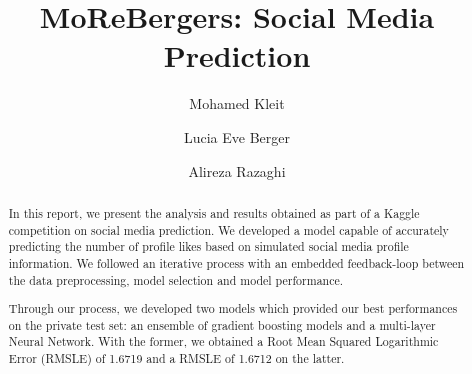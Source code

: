\documentclass[sigplan,screen]{acmart}
\begin{document}
\title{MoReBergers: Social Media Prediction}

\author{Mohamed Kleit}

\author{Lucia Eve Berger}

\author{Alireza  Razaghi}

\begin{abstract}
In this report, we present the analysis and results obtained as part of a Kaggle competition on social media prediction. We developed a model capable of accurately predicting the number of profile likes based on simulated social media profile information. We followed an iterative process with an embedded feedback-loop between the data preprocessing, model selection and model performance. 

Through our process, we developed two models which provided our best performances on the private test set: an ensemble of gradient boosting models and a multi-layer Neural Network. With the former, we obtained a Root Mean Squared Logarithmic Error (RMSLE) of 1.6719 and a RMSLE of 1.6712 on the latter.
\end{abstract}
\end{document}
